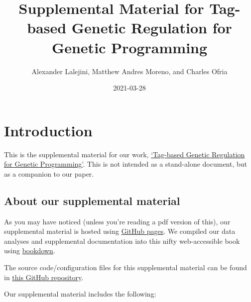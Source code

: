\documentclass[]{book}
\title{Supplemental Material for Tag-based Genetic Regulation for Genetic Programming}
\author{Alexander Lalejini, Matthew Andres Moreno, and Charles Ofria}
\date{2021-03-28}
\begin{document}
\maketitle

{
\setcounter{tocdepth}{1}
\tableofcontents
}
\hypertarget{introduction}{%
\chapter{Introduction}\label{introduction}}

This is the supplemental material for our work, \href{https://arxiv.org/abs/2012.09229}{`Tag-based Genetic Regulation for Genetic Programming'}.
This is not intended as a stand-alone document, but as a companion to our paper.

\hypertarget{about-our-supplemental-material}{%
\section{About our supplemental material}\label{about-our-supplemental-material}}

As you may have noticed (unless you're reading a pdf version of this), our supplemental material is hosted using \href{https://pages.github.com/}{GitHub pages}.
We compiled our data analyses and supplemental documentation into this nifty web-accessible book using \href{https://bookdown.org}{bookdown}.

The source code/configuration files for this supplemental material can be found in \href{https://github.com/amlalejini/Tag-based-Genetic-Regulation-for-LinearGP}{this GitHub repository}.

Our supplemental material includes the following:
\end{document}
